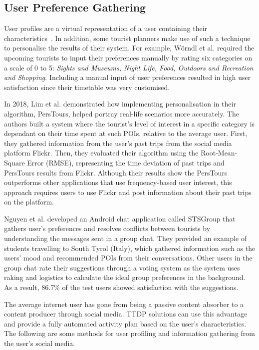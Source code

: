 \subsection{User Preference Gathering}

User profiles are a virtual representation of a user
containing their characteristics~\cite{Cufoglu}. In
addition, some tourist planners make use of such a
technique to personalise the results of their
system. For example, Wörndl et al.
\cite{Worndl2017} required the upcoming tourists to
input their preferences manually by rating six
categories on a scale of 0 to 5: \textit{Sights and Museums,
Night Life, Food, Outdoors and Recreation
 and Shopping}. Including a manual input of user
preferences resulted in high user satisfaction since
their timetable was very customised.


In 2018, Lim et al.\cite{Lim2018a} demonstrated how
implementing personalisation in their algorithm,
PersTours, helped portray real-life scenarios more
accurately. The authors built a system where the
tourist’s level of interest in a specific category is
dependant on their time spent at such POIs, relative
to the average user. First, they gathered information
from the user’s past trips from the social media
platform Flickr. Then, they evaluated their algorithm
using the Root-Mean-Square Error (RMSE), representing
the time deviation of past trips and PersTours results
from Flickr. Although their results show the PersTours
outperforms other applications that use
frequency-based user interest, this approach requires
users to use Flickr and post information about their
past trips on the platform.
 
Nguyen et al.\cite{Nguyen2018} developed an Android
chat application called STSGroup that gathers user’s
preferences and resolves conflicts between tourists by
understanding the messages sent in a group chat. They
provided an example of students travelling to South
Tyrol (Italy), which gathered information such as the
users’ mood and recommended POIs from their
conversations. Other users in the group chat rate
their suggestions through a voting system as the
system uses raking and logistics to calculate
the ideal group preferences in the background. As a
result, 86.7\% of the test users showed satisfaction
with the suggestions.  


The average internet user has gone from being a
passive content absorber to a content producer through
social media. TTDP solutions can use this advantage
and provide a fully automated activity plan based on
the user's characteristics. The following are some
methods for user profiling and information gathering
from the user's social media. 


